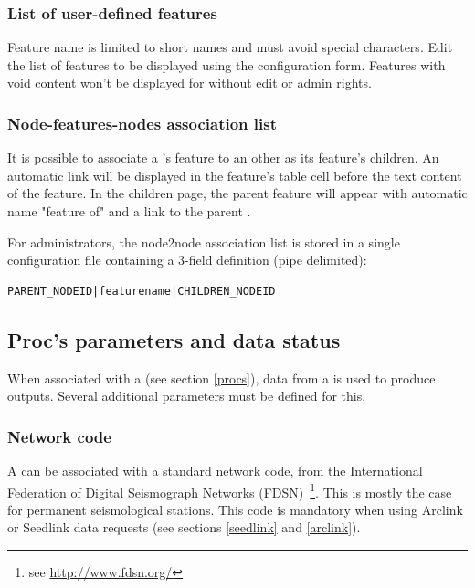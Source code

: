 \subsubsection{List of user-defined features}

Feature name is limited to short names and must avoid special characters. Edit the list of features to be displayed using the  configuration form. Features with void content won't be displayed for  without edit or admin rights.

\subsubsection{Node-features-nodes association list}

It is possible to associate a 's feature to an other  as its feature's children. An automatic link will be displayed in the feature's table cell before the text content of the feature. In the children  page, the parent feature will appear with automatic name "feature of" and a link to the parent .

For administrators, the node2node association list is stored in a single configuration file containing a 3-field definition (pipe delimited):

\begin{lstlisting}[title=\wofile{nodes2nodes.rc} (excerpt)]
PARENT_NODEID|featurename|CHILDREN_NODEID
\end{lstlisting}


\subsection{Proc's parameters and data status}
\label{nodeprocparam}
When associated with a  (see section \ref{procs}), data from a  is used to produce outputs. Several additional parameters must be defined for this.


\subsubsection{Network code}

A  can be associated with a standard network code, from the International Federation of Digital Seismograph Networks (FDSN)~\footnote{see \url{http://www.fdsn.org/}}. This is mostly the case for permanent seismological stations. This code is mandatory when using Arclink or Seedlink data requests (see sections \ref{seedlink} and \ref{arclink}).

